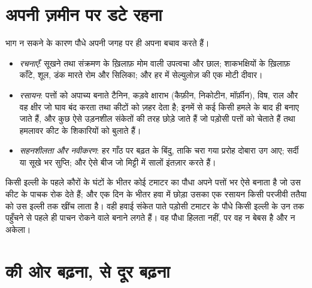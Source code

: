 \section{अपनी ज़मीन पर डटे रहना}

\begin{proposition}[किसी जड़ जमाए जीव के बचाव]\label{prop:g12:plant-rooted-life:defences}
भाग न सकने के कारण पौधे अपनी जगह पर ही अपना बचाव करते हैं।
\begin{itemize}
  \item \emph{रचनाएँ}: सूखने तथा संक्रमण के ख़िलाफ़ मोम वाली उपत्वचा और
        छाल; शाकभक्षियों के ख़िलाफ़ काँटे, शूल, डंक मारते रोम और सिलिका;
        और हर  में सेल्युलोज़ की एक मोटी दीवार।
  \item \emph{रसायन}: पत्तों को अपाच्य बनाते टैनिन, कड़वे क्षाराभ (कैफ़ीन,
        निकोटीन, मॉर्फ़ीन), विष, राल और वह क्षीर जो घाव बंद करता तथा कीटों
        को ज़हर देता है; इनमें से कई किसी हमले के बाद ही बनाए जाते हैं, और
        कुछ ऐसे उड़नशील संकेतों की तरह छोड़े जाते हैं जो पड़ोसी पत्तों को
        चेताते हैं तथा हमलावर कीट के शिकारियों को बुलाते हैं।
  \item \emph{सहनशीलता और नवीकरण}: हर गाँठ पर बढ़त के बिंदु, ताकि चरा गया
        प्ररोह दोबारा उग आए; सर्दी या सूखे भर सुप्ति; और ऐसे बीज जो
        मिट्टी में सालों इंतज़ार करते हैं।
\end{itemize}
\end{proposition}
\admitted

\begin{example}[किसी इल्ली का भोजन, और उसका जवाब]\label{ex:g12:plant-rooted-life:caterpillar}
किसी इल्ली के पहले कौरों के घंटों के भीतर कोई टमाटर का पौधा अपने पत्तों भर
ऐसे  बनाता है जो उस कीट के पाचक  रोक देते हैं; और एक दिन के
भीतर हवा में छोड़ा उसका एक रसायन किसी परजीवी ततैया को उस इल्ली तक खींच लाता
है। वही हवाई संकेत पाते पड़ोसी टमाटर के पौधे किसी इल्ली के उन तक पहुँचने से
पहले ही पाचन रोकने वाले बनाने लगते हैं। वह पौधा हिलता नहीं, पर वह न
बेबस है और न अकेला।
\end{example}

\section{की ओर बढ़ना, से दूर बढ़ना}

